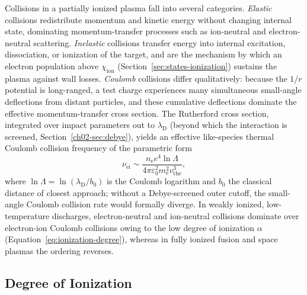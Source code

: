 Collisions in a partially ionized plasma fall into several categories. \emph{Elastic} collisions redistribute momentum and kinetic energy without changing internal state, dominating momentum-transfer processes such as ion-neutral and electron-neutral scattering. \emph{Inelastic} collisions transfer energy into internal excitation, dissociation, or ionization of the target, and are the mechanism by which an electron population above $\chi_{\mathrm{ion}}$ (Section~\ref{sec:states-ionization}) sustains the plasma against wall losses. \emph{Coulomb} collisions differ qualitatively: because the $1/r$ potential is long-ranged, a test charge experiences many simultaneous small-angle deflections from distant particles, and these cumulative deflections dominate the effective momentum-transfer cross section. The Rutherford cross section, integrated over impact parameters out to $\lambda_{\mathrm{D}}$ (beyond which the interaction is screened, Section~\ref{ch02-sec:debye}), yields an effective like-species thermal Coulomb collision frequency of the parametric form
\begin{equation}
\nu_{\mathrm{ei}} \sim \frac{n_{\mathrm{e}} e^{4} \ln\Lambda}{4\pi\varepsilon_{0}^{2} m_{\mathrm{e}}^{2} v_{\mathrm{the}}^{3}},
\label{eq:coulomb-frequency}
\end{equation}
where $\ln\Lambda = \ln(\lambda_{\mathrm{D}}/b_{0})$ is the Coulomb logarithm and $b_{0}$ the classical distance of closest approach; without a Debye-screened outer cutoff, the small-angle Coulomb collision rate would formally diverge. In weakly ionized, low-temperature discharges, electron-neutral and ion-neutral collisions dominate over electron-ion Coulomb collisions owing to the low degree of ionization $\alpha$ (Equation~\eqref{eq:ionization-degree}), whereas in fully ionized fusion and space plasmas the ordering reverses.

\subsection{Degree of Ionization}

